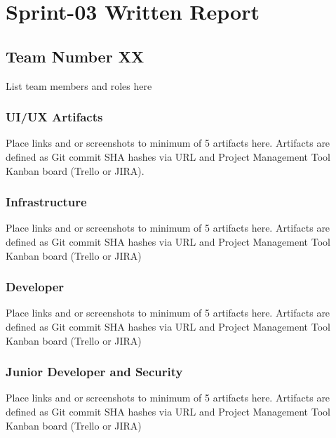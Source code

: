 \documentclass[]{article}
\date{}
\begin{document}
\hypertarget{sprint-03-written-report}{%
\section{Sprint-03 Written Report}\label{sprint-03-written-report}}

\hypertarget{team-number-xx}{%
\subsection{Team Number XX}\label{team-number-xx}}

List team members and roles here

\hypertarget{uiux-artifacts}{%
\subsubsection{UI/UX Artifacts}\label{uiux-artifacts}}

Place links and or screenshots to minimum of 5 artifacts here. Artifacts
are defined as Git commit SHA hashes via URL and Project Management Tool
Kanban board (Trello or JIRA).

\hypertarget{infrastructure}{%
\subsubsection{Infrastructure}\label{infrastructure}}

Place links and or screenshots to minimum of 5 artifacts here. Artifacts
are defined as Git commit SHA hashes via URL and Project Management Tool
Kanban board (Trello or JIRA)

\hypertarget{developer}{%
\subsubsection{Developer}\label{developer}}

Place links and or screenshots to minimum of 5 artifacts here. Artifacts
are defined as Git commit SHA hashes via URL and Project Management Tool
Kanban board (Trello or JIRA)

\hypertarget{junior-developer-and-security}{%
\subsubsection{Junior Developer and
Security}\label{junior-developer-and-security}}

Place links and or screenshots to minimum of 5 artifacts here. Artifacts
are defined as Git commit SHA hashes via URL and Project Management Tool
Kanban board (Trello or JIRA)
\end{document}
